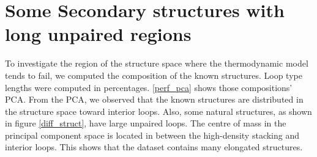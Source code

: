 \section{Some Secondary structures with long unpaired regions}
To investigate the region of the structure space where the thermodynamic model tends to fail, we computed the composition of the known structures. Loop type lengths were computed in percentages. \autoref{perf_pca} shows those compositions' \ac{PCA}. From the \ac{PCA}, we observed that the known structures are distributed in the structure space toward interior loops. Also, some natural structures, as shown in figure \ref{diff_struct}, have large unpaired loops. The centre of mass in the principal component space is located in between the high-density stacking and interior loops. This shows that the dataset contains many elongated structures.
